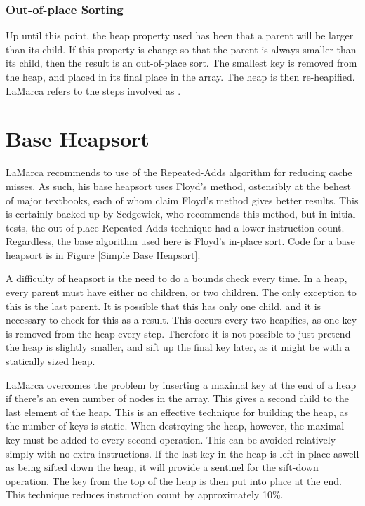 \subsubsection{Out-of-place Sorting}
Up until this point, the heap property used has been that a parent will be
larger than its child. If this property is change so that the parent is always
smaller than its child, then the result is an out-of-place sort. The smallest
key is removed from the heap, and placed in its final place in the array. The
heap is then re-heapified. LaMarca refers to the steps involved as
.

\section{Base Heapsort}
LaMarca recommends to use of the Repeated-Adds algorithm for reducing
cache misses. As such, his base heapsort uses Floyd's method, ostensibly at
the behest of major textbooks, each of whom claim Floyd's method gives better
results. This is certainly backed up by Sedgewick, who recommends this method,
but in initial tests, the out-of-place Repeated-Adds technique had a lower
instruction count. Regardless, the base algorithm used here is Floyd's in-place
sort. Code for a base heapsort is in Figure \ref{Simple Base Heapsort}.


A difficulty of heapsort is the need to do a bounds check every time. In a heap,
every parent must have either no children, or two children. The only exception
to this is the last parent. It is possible that this has only one child, and it
is necessary to check for this as a result. This occurs every two heapifies, as
one key is removed from the heap every step. Therefore it is not possible to just
pretend the heap is slightly smaller, and sift up the final key later, as it
might be with a statically sized heap.

LaMarca overcomes the problem by inserting a maximal key at the end of a heap if
there's an even number of nodes in the array. This gives a second child to the
last element of the heap. This is an effective technique for building the heap,
as the number of keys is static. When destroying the heap, however, the
maximal key must be added to every second operation. This can be avoided
relatively simply with no extra instructions. If the last key in the heap is
left in place aswell as being sifted down the heap, it will provide a
sentinel for the sift-down operation. The key from the top of the heap is then
put into place at the end. This technique reduces instruction count by
approximately 10\%.


